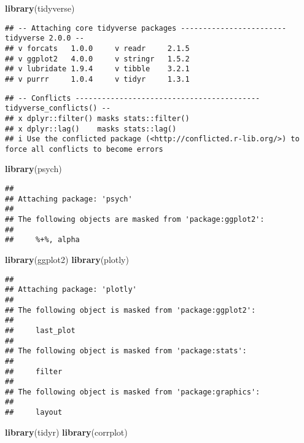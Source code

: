\documentclass[
]{article}
\newenvironment{Shaded}{\begin{snugshade}}{\end{snugshade}}
\newcommand{\FunctionTok}[1]{\textcolor[rgb]{0.13,0.29,0.53}{\textbf{#1}}}
\newcommand{\NormalTok}[1]{#1}
\begin{document}
\begin{Shaded}
\begin{Highlighting}[]
\FunctionTok{library}\NormalTok{(tidyverse)}
\end{Highlighting}
\end{Shaded}

\begin{verbatim}
## -- Attaching core tidyverse packages ------------------------ tidyverse 2.0.0 --
## v forcats   1.0.0     v readr     2.1.5
## v ggplot2   4.0.0     v stringr   1.5.2
## v lubridate 1.9.4     v tibble    3.2.1
## v purrr     1.0.4     v tidyr     1.3.1
\end{verbatim}

\begin{verbatim}
## -- Conflicts ------------------------------------------ tidyverse_conflicts() --
## x dplyr::filter() masks stats::filter()
## x dplyr::lag()    masks stats::lag()
## i Use the conflicted package (<http://conflicted.r-lib.org/>) to force all conflicts to become errors
\end{verbatim}

\begin{Shaded}
\begin{Highlighting}[]
\FunctionTok{library}\NormalTok{(psych)}
\end{Highlighting}
\end{Shaded}

\begin{verbatim}
## 
## Attaching package: 'psych'
## 
## The following objects are masked from 'package:ggplot2':
## 
##     %+%, alpha
\end{verbatim}

\begin{Shaded}
\begin{Highlighting}[]
\FunctionTok{library}\NormalTok{(ggplot2)}
\FunctionTok{library}\NormalTok{(plotly)}
\end{Highlighting}
\end{Shaded}

\begin{verbatim}
## 
## Attaching package: 'plotly'
## 
## The following object is masked from 'package:ggplot2':
## 
##     last_plot
## 
## The following object is masked from 'package:stats':
## 
##     filter
## 
## The following object is masked from 'package:graphics':
## 
##     layout
\end{verbatim}

\begin{Shaded}
\begin{Highlighting}[]
\FunctionTok{library}\NormalTok{(tidyr)}
\FunctionTok{library}\NormalTok{(corrplot)}
\end{Highlighting}
\end{Shaded}
\end{document}

